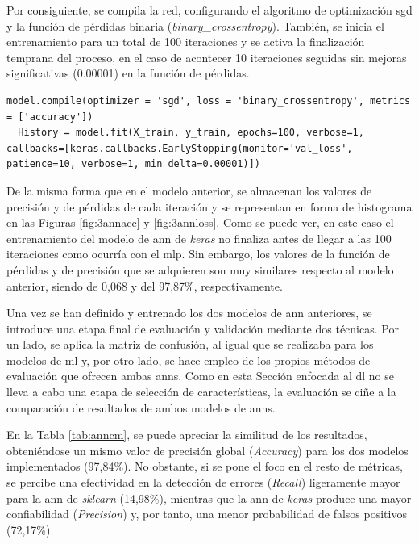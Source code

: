 \vspace{3mm}

Por consiguiente, se compila la red, configurando el algoritmo de optimización \gls{sgd} y la función de pérdidas binaria (\textit{binary\_crossentropy}). También, se inicia el entrenamiento para un total de 100 iteraciones y se activa la finalización temprana del proceso, en el caso de acontecer 10 iteraciones seguidas sin mejoras significativas (0.00001) en la función de pérdidas. \cite{early}

\vspace{3mm}

\begin{lstlisting}[style=Python, caption={Entrenamiento del modelo de ANN de Keras}]
  model.compile(optimizer = 'sgd', loss = 'binary_crossentropy', metrics = ['accuracy'])
  History = model.fit(X_train, y_train, epochs=100, verbose=1, callbacks=[keras.callbacks.EarlyStopping(monitor='val_loss', patience=10, verbose=1, min_delta=0.00001)])
\end{lstlisting}

\vspace{3mm}

De la misma forma que en el modelo anterior, se almacenan los valores de precisión y de pérdidas de cada iteración y se representan en forma de histograma en las Figuras \ref{fig:3annacc} y \ref{fig:3annloss}. Como se puede ver, en este caso el entrenamiento del modelo de \gls{ann} de \textit{keras} no finaliza antes de llegar a las 100 iteraciones como ocurría con el \gls{mlp}. Sin embargo, los valores de la función de pérdidas y de precisión que se adquieren son muy similares respecto al modelo anterior, siendo de 0,068 y del 97,87\%, respectivamente. 

\vspace{3mm}

Una vez se han definido y entrenado los dos modelos de \gls{ann} anteriores, se introduce una etapa final de evaluación y validación mediante dos técnicas. Por un lado, se aplica la matriz de confusión, al igual que se realizaba para los modelos de \gls{ml} y, por otro lado, se hace empleo de los propios métodos de evaluación que ofrecen ambas \gls{ann}s. Como en esta Sección enfocada al \gls{dl} no se lleva a cabo una etapa de selección de características, la evaluación se ciñe a la comparación de resultados de ambos modelos de \gls{ann}s. 

\vspace{3mm}

En la Tabla \ref{tab:anncm}, se puede apreciar la similitud de los resultados, obteniéndose un mismo valor de precisión global (\textit{Accuracy}) para los dos modelos implementados (97,84\%). No obstante, si se pone el foco en el resto de métricas, se percibe una efectividad en la detección de errores (\textit{Recall}) ligeramente mayor para la \gls{ann} de \textit{sklearn} (14,98\%), mientras que
la \gls{ann} de \textit{keras} produce una mayor confiabilidad (\textit{Precision}) y, por tanto, una menor probabilidad de falsos positivos (72,17\%).

